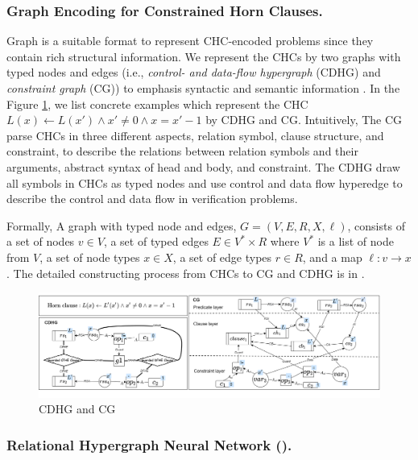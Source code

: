 \subsubsection{Graph Encoding for Constrained Horn Clauses.}

Graph is a suitable format to represent CHC-encoded problems since they contain rich structural information.
%
We represent the CHCs by two graphs with typed nodes and edges (i.e., \emph{control- and data-flow hypergraph} (CDHG) and \emph{constraint graph} (CG)) to emphasis syntactic and semantic information \cite{HornGraph}.
%
In the Figure \ref{fig:CDHG-CG-examples}, we list concrete examples which represent the CHC $L(x)\leftarrow L(x') \wedge x'\neq 0 \wedge x=x'-1 $ by CDHG and CG.
%
Intuitively, The CG parse CHCs in three different aspects, relation symbol, clause structure, and constraint, to describe the relations between relation symbols and their arguments, abstract syntax of head and body, and constraint.
%
The CDHG draw all symbols in CHCs as typed nodes and use control and data flow hyperedge to describe the control and data flow in verification problems. 


Formally, A graph with typed node and edges, $G=(V,\mathit{E},R,X,\ell)$, consists of a set of nodes $v\in V$, a set of typed edges $\mathit{E} \in V^{*} \times R$ where $V^{*}$ is a list of node from $V$, a set of node types $x\in X$, a set of edge types $r\in R$, and a map $\ell: v\rightarrow x$.
%
The detailed constructing process from CHCs to CG and CDHG is in \cite{HornGraph}.


\begin{figure}[t]
\includegraphics[width=\textwidth]{figures/CDHG-CG-examples.png}
\caption{CDHG and CG} \label{fig:CDHG-CG-examples}
\end{figure}


\subsubsection{Relational Hypergraph Neural Network (\hyperedgeGNN).}

